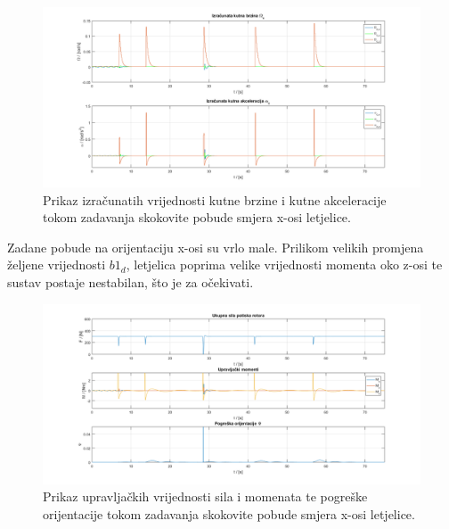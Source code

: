 \documentclass[times, utf8, diplomski, numeric]{fer}
\begin{document}
	\begin{figure}[!h]
		\includegraphics[width=\textwidth]{plots/b1d_alpha_omega2.png}
		\caption{Prikaz izračunatih vrijednosti kutne brzine i kutne  akceleracije tokom zadavanja skokovite pobude smjera x-osi letjelice.}
	\end{figure}
	
	Zadane pobude na orijentaciju x-osi su vrlo male. Prilikom velikih promjena željene vrijednosti $b1_d$, letjelica poprima velike vrijednosti momenta oko z-osi te sustav postaje nestabilan, što je za očekivati. 
	
	\newpage
	\clearpage
	
	\begin{figure}[h!]
		\includegraphics[width=\textwidth]{plots/b1d_force_moments2.png}
		\caption{Prikaz upravljačkih vrijednosti sila i momenata te pogreške orijentacije tokom zadavanja skokovite pobude smjera x-osi letjelice.}
	\end{figure}
	
\end{document}
